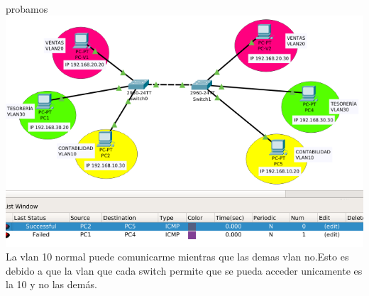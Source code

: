 \\probamos\\
\includegraphics[scale=0.5]{img/sucess10.png} \\
La vlan 10 normal puede comunicarme mientras que las demas vlan no.Esto es debido a que la vlan que cada switch permite que se pueda acceder unicamente es la 10 y no las dem\'as.


